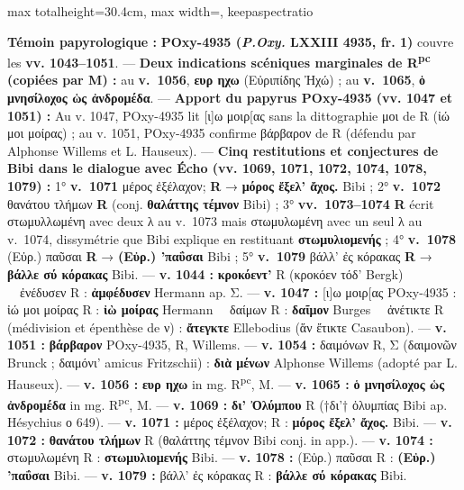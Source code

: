 \documentclass[11pt,twoside]{book}
\newcommand{\italique}[1]{\textit{#1}}
\newcommand{\auDessus}[2]{\leavevmode\vbox{\offinterlineskip\ialign{\hfil##\hfil\cr\fontsize{5.5pt}{6pt}\selectfont #2\cr\noalign{\kern0.1ex}#1\cr}}}
\newcommand{\expo}[1]{\textsuperscript{#1}}
\newcommand{\R}{\textbf{R}}
\newcommand{\Rpc}{R\expo{pc}}
\newcommand{\Mon}{M}
\newcommand{\PsiQuatre}{POxy-4935}
\newcommand{\lecon}[1]{\textbf{#1}}
\newcommand{\espApp}{\ {\color{ruleGold}{\policeFr ∥}}\ }
\begin{document}
\begin{adjustbox}{max totalheight=30.4cm, max width=\textwidth, keepaspectratio}
\begin{minipage}{\textwidth}
{ \textbf{Témoin papyrologique :} \textbf{\PsiQuatre{} (\italique{P.Oxy.} LXXIII 4935, fr. 1)} couvre les \textbf{vv. 1043–1051}. --- \textbf{Deux indications scéniques marginales de \Rpc{} (copiées par \Mon{}) :} au \textbf{v.~1056}, \lecon{ευρ\auDessus{ι}{π} ηχω} (Εὐριπίδης Ἠχώ) ; au \textbf{v.~1065}, \lecon{ὁ μνησίλοχος ὡς ἀνδρομέδα}. --- \textbf{Apport du papyrus \PsiQuatre{} (vv. 1047 et 1051) :} Au v. 1047, \PsiQuatre{} lit [ι]ω μοιρ[ας sans la dittographie μοι de R (ἰώ μοι μοίρας) ; au v. 1051, \PsiQuatre{} confirme βάρβαρον de R (défendu par Alphonse Willems et L. Hauseux). --- \textbf{Cinq restitutions et conjectures de Bibi dans le dialogue avec Écho (vv. 1069, 1071, 1072, 1074, 1078, 1079) :} 1° \textbf{v.~1071} μέρος ἐξέλαχον; \R{} → \lecon{μόρος ἔξελ' ἄχος.} Bibi ; 2° \textbf{v.~1072} θανάτου τλήμων \R{} (conj. \lecon{θαλάττης τέμνον} Bibi) ; 3° \textbf{vv.~1073–1074} \R{} écrit στωμυλλωμένη avec deux λ au v.~1073 mais στωμυλωμένη avec un seul λ au v.~1074, dissymétrie que Bibi explique en restituant \lecon{στωμυλιομενής} ; 4° \textbf{v.~1078} (Εὐρ.) παῦσαι \R{} → \lecon{(Εὐρ.) 'παΰσαι} Bibi ; 5° \textbf{v.~1079} βάλλ' ἐς κόρακας \R{} → \lecon{βάλλε σύ κόρακας} Bibi. --- \textbf{v. 1044 :} \lecon{κροκόεντ'} R (κροκόεν τόδ' Bergk) \espApp ἐνέδυσεν R : \lecon{ἀμφέδυσεν} Hermann ap. {\policeGr Σ}. --- \textbf{v. 1047 :} [ι]ω μοιρ[ας \PsiQuatre{} : ἰώ μοι μοίρας R : \lecon{ἰὼ μοίρας} Hermann \espApp δαίμων R : \lecon{δαῖμον} Burges \espApp ἀνέτικτε R (médivision et épenthèse de ν) : \lecon{ἄτεγκτε} Ellebodius (ἅν ἔτικτε Casaubon). --- \textbf{v. 1051 :} \lecon{βάρβαρον} \PsiQuatre{}, R, Willems. --- \textbf{v. 1054 :} δαιμόνων R, {\policeGr Σ} (δαιμονῶν Brunck ; δαιμόνι' amicus Fritzschii) : \lecon{διὰ μένων} Alphonse Willems (adopté par L. Hauseux). --- \textbf{v. 1056 :} \lecon{ευρ\auDessus{ι}{π} ηχω} in mg. \Rpc{}, M. --- \textbf{v. 1065 :} \lecon{ὁ μνησίλοχος ὡς ἀνδρομέδα} in mg. \Rpc{}, M. --- \textbf{v. 1069 :} \lecon{δι' Ὀλύμπου} R (†δι'† ὀλυμπίας Bibi ap. Hésychius ο 649). --- \textbf{v. 1071 :} μέρος ἐξέλαχον; R : \lecon{μόρος ἔξελ' ἄχος.} Bibi. --- \textbf{v. 1072 :} \lecon{θανάτου τλήμων} R (θαλάττης τέμνον Bibi conj. in app.). --- \textbf{v. 1074 :} στωμυλωμένη R : \lecon{στωμυλιομενής} Bibi. --- \textbf{v. 1078 :} (Εὐρ.) παῦσαι R : \lecon{(Εὐρ.) 'παΰσαι} Bibi. --- \textbf{v. 1079 :} βάλλ' ἐς κόρακας R : \lecon{βάλλε σύ κόρακας} Bibi.\par}
\end{minipage}\end{adjustbox}
\end{document}
